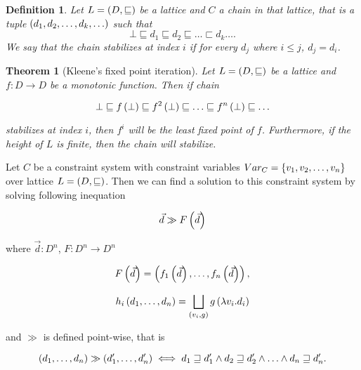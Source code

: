 \documentclass[..thesis.tex]{subfiles}
\newtheorem{defin}{Definition}[section]
\newtheorem{kleene-fix}{Theorem}[section]
\begin{document}
\begin{defin}
  Let $L = \left( D, \sqsubseteq \right)$ be a lattice and $C$ a \textit{chain} in that lattice, that is a tuple $ \left( d_1, d_2, \ldots, d_k, \ldots \right)$ such that
  \begin{equation*}
    \bot \sqsubseteq d_1 \sqsubseteq d_2 \sqsubseteq \ldots \sqsubset d_k \ldots \text{.}
  \end{equation*}
  We say that the chain \textit{stabilizes} at index $i$ if for every $d_j$ where $ i \leq j$, $ d_j = d_i$. 
\end{defin}

\begin{kleene-fix}[Kleene's fixed point iteration]
Let $L = \left( D, \sqsubseteq \right) $ be a lattice and $f : D \to D$ be a monotonic function. Then if chain 

\begin{equation*}
\bot \sqsubseteq f \left( \bot \right) \sqsubseteq f^2 \left( \bot \right) \sqsubseteq \ldots \sqsubseteq f^n \left( \bot \right) \sqsubseteq \ldots
\end{equation*}

stabilizes at index $i$, then $f^{i}$ will be the least fixed point of $f$. Furthermore, if the height of $L$ is finite, then the chain will stabilize.
\end{kleene-fix}

Let $C$ be a constraint system with constraint variables $Var_C= \left\lbrace v_1, v_2, \ldots, v_n \right\rbrace$ over lattice $L = \left( D, \sqsubseteq \right)$. Then we can find a solution to this constraint system by solving following inequation

\begin{equation}
  \label{one-function}
  \vec{d} \gg F \left( \vec{d}  \right) 
\end{equation}


where $\vec{d} : D^n$, $F :  D^{n} \to D^{n}$

\begin{equation*}
  F \left( \vec{d} \right)  = \left( f_1 \left( \vec{d} \right) , \ldots, f_n \left( \vec{d} \right) \right) \text{,}
\end{equation*}   


\begin{equation*}
  h_i \left( d_1, \ldots, d_n \right) = \bigsqcup_{\left( v_i, g \right)} g \left( \lambda v_i. d_i \right)
\end{equation*}

and $\gg$ is defined point-wise, that is 

\begin{equation*}
\left( d_1, \ldots, d_n \right) \gg \left( d_1', \ldots, d_n' \right) \iff  d_1 \sqsupseteq d_1' \land d_2 \sqsupseteq d_2' \land \ldots \land d_n \sqsupseteq d_n' \text{.}
\end{equation*}
\end{document}
